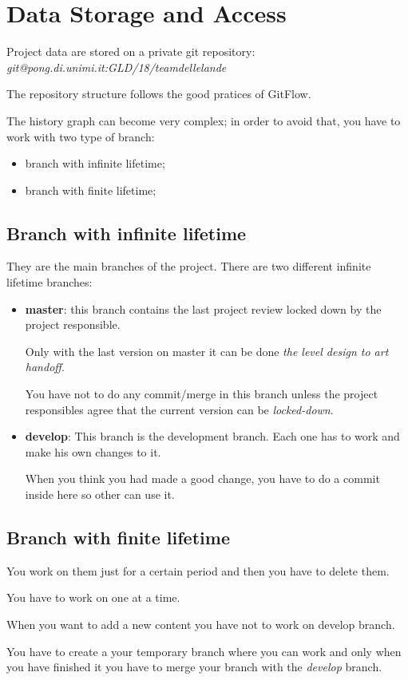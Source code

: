 \documentclass[12pt]{article}
\begin{document}
\section{Data Storage and Access}
Project data are stored on a private git repository: \textit{git@pong.di.unimi.it:GLD/18/teamdellelande}

The repository structure follows the good pratices of GitFlow.

The history graph can become very complex; in order to avoid that, you have to work with two type of branch:
\begin{itemize}
\item branch with infinite lifetime;
\item branch with finite lifetime;
\end{itemize}

\subsection{Branch with infinite lifetime}
They are the main branches of the project. There are two different infinite lifetime branches:
\begin{itemize}
\item \textbf{master}: this branch contains the last project review locked down by the project responsible.
    
  Only with the last version on master it can be done \textit{the level design to art handoff}.
  
  You have not to do any commit/merge in this branch unless the project responsibles agree that the current version can be \textit{locked-down}.
\item \textbf{develop}: This branch is the development branch. Each one has to work and make his own changes to it.
  
  When you think you had made a good change, you have to do a commit inside here so other can use it.
\end{itemize}

\subsection{Branch with finite lifetime}
You work on them just for a certain period and then you have to delete them.

You have to work on one at a time.

When you want to add a new content you have not to work on develop branch.

You have to create a your temporary branch where you can work and only when you have finished it
you have to merge your branch with the \textit{develop} branch.
\end{document}
